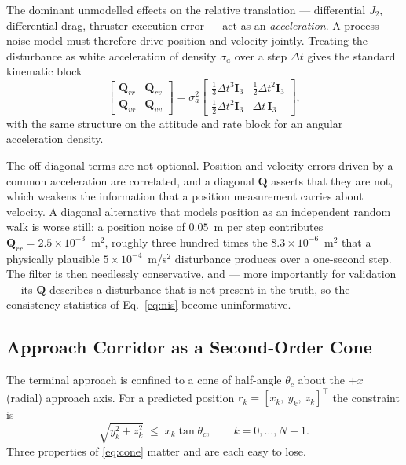 The dominant unmodelled effects on the relative translation --- differential
$J_2$, differential drag, thruster execution error --- act as an
\emph{acceleration}. A process noise model must therefore drive position and
velocity jointly. Treating the disturbance as white acceleration of density
$\sigma_a$ over a step $\Delta t$ gives the standard kinematic block
\begin{equation}
\begin{bmatrix}
\mathbf{Q}_{rr} & \mathbf{Q}_{rv} \\
\mathbf{Q}_{vr} & \mathbf{Q}_{vv}
\end{bmatrix}
= \sigma_a^2
\begin{bmatrix}
\tfrac{1}{3}\Delta t^3 \mathbf{I}_3 & \tfrac{1}{2}\Delta t^2 \mathbf{I}_3 \\
\tfrac{1}{2}\Delta t^2 \mathbf{I}_3 & \Delta t\, \mathbf{I}_3
\end{bmatrix},
\label{eq:Q_kin}
\end{equation}
with the same structure on the attitude and rate block for an angular
acceleration density.

The off-diagonal terms are not optional. Position and velocity errors driven by
a common acceleration are correlated, and a diagonal $\mathbf{Q}$ asserts that
they are not, which weakens the information that a position measurement carries
about velocity. A diagonal alternative that models position as an independent
random walk is worse still: a position noise of $0.05$~m per step contributes
$\mathbf{Q}_{rr} = 2.5 \times 10^{-3}$~m$^2$, roughly three hundred times the
$8.3 \times 10^{-6}$~m$^2$ that a physically plausible
$5 \times 10^{-4}$~m/s$^2$ disturbance produces over a one-second step. The
filter is then needlessly conservative, and --- more importantly for
validation --- its $\mathbf{Q}$ describes a disturbance that is not present in
the truth, so the consistency statistics of Eq.~\eqref{eq:nis} become
uninformative.

\subsection{Approach Corridor as a Second-Order Cone}
\label{sec:cone}

The terminal approach is confined to a cone of half-angle $\theta_c$ about the
$+x$ (radial) approach axis. For a predicted position
$\mathbf{r}_k = [x_k,\ y_k,\ z_k]^{\top}$ the constraint is
\begin{equation}
\sqrt{y_k^2 + z_k^2} \;\le\; x_k \tan\theta_c ,
\qquad k = 0,\dots,N-1 .
\label{eq:cone}
\end{equation}
Three properties of \eqref{eq:cone} matter and are each easy to lose.

